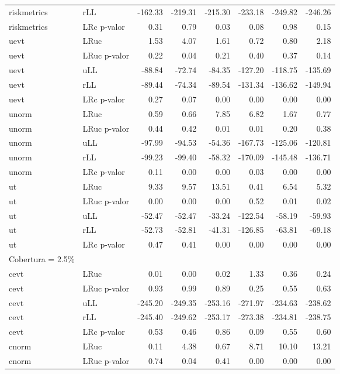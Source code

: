 \begin{longtable}{llrrrrrr}
  riskmetrics & rLL & -162.33 & -219.31 & -215.30 & -233.18 & -249.82 & -246.26 \\ 
  riskmetrics & LRc p-valor & 0.31 & 0.79 & 0.03 & 0.08 & 0.98 & 0.15 \\ 
  uevt & LRuc & 1.53 & 4.07 & 1.61 & 0.72 & 0.80 & 2.18 \\ 
  uevt & LRuc p-valor & 0.22 & 0.04 & 0.21 & 0.40 & 0.37 & 0.14 \\ 
  uevt & uLL & -88.84 & -72.74 & -84.35 & -127.20 & -118.75 & -135.69 \\ 
  uevt & rLL & -89.44 & -74.34 & -89.54 & -131.34 & -136.62 & -149.94 \\ 
  uevt & LRc p-valor & 0.27 & 0.07 & 0.00 & 0.00 & 0.00 & 0.00 \\ 
  unorm & LRuc & 0.59 & 0.66 & 7.85 & 6.82 & 1.67 & 0.77 \\ 
  unorm & LRuc p-valor & 0.44 & 0.42 & 0.01 & 0.01 & 0.20 & 0.38 \\ 
  unorm & uLL & -97.99 & -94.53 & -54.36 & -167.73 & -125.06 & -120.81 \\ 
  unorm & rLL & -99.23 & -99.40 & -58.32 & -170.09 & -145.48 & -136.71 \\ 
  unorm & LRc p-valor & 0.11 & 0.00 & 0.00 & 0.03 & 0.00 & 0.00 \\ 
  ut & LRuc & 9.33 & 9.57 & 13.51 & 0.41 & 6.54 & 5.32 \\ 
  ut & LRuc p-valor & 0.00 & 0.00 & 0.00 & 0.52 & 0.01 & 0.02 \\ 
  ut & uLL & -52.47 & -52.47 & -33.24 & -122.54 & -58.19 & -59.93 \\ 
  ut & rLL & -52.73 & -52.81 & -41.31 & -126.85 & -63.81 & -69.18 \\ 
  ut & LRc p-valor & 0.47 & 0.41 & 0.00 & 0.00 & 0.00 & 0.00 \\ 
  Cobertura = 2.5\% &  &  &  &  &  &  &  \\ 
  cevt & LRuc & 0.01 & 0.00 & 0.02 & 1.33 & 0.36 & 0.24 \\ 
  cevt & LRuc p-valor & 0.93 & 0.99 & 0.89 & 0.25 & 0.55 & 0.63 \\ 
  cevt & uLL & -245.20 & -249.35 & -253.16 & -271.97 & -234.63 & -238.62 \\ 
  cevt & rLL & -245.40 & -249.62 & -253.17 & -273.38 & -234.81 & -238.75 \\ 
  cevt & LRc p-valor & 0.53 & 0.46 & 0.86 & 0.09 & 0.55 & 0.60 \\ 
  cnorm & LRuc & 0.11 & 4.38 & 0.67 & 8.71 & 10.10 & 13.21 \\ 
  cnorm & LRuc p-valor & 0.74 & 0.04 & 0.41 & 0.00 & 0.00 & 0.00 \\ 

\end{longtable}
